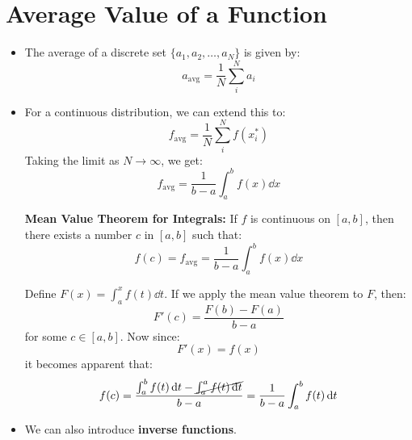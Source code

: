 \section{Average Value of a Function}
\begin{itemize}
    \item The average of a discrete set $\{a_1,a_2,\dots,a_N\}$ is given by:
    \begin{equation}
        a_\text{avg} = \frac{1}{N}\sum_{i}^{N} a_i
        \label{eq:}
    \end{equation}
    \item For a continuous distribution, we can extend this to:
    \begin{equation}
        f_\text{avg} = \frac{1}{N}\sum_{i}^N f(x_i^*)
        \label{eq:}
    \end{equation}
    Taking the limit as $N\to\infty$, we get:
    \begin{equation}
        f_\text{avg} = \frac{1}{b-a} \int_a^b f(x) \dd{x}
        \label{eq:}
    \end{equation}
    \begin{theorem}
        \textbf{Mean Value Theorem for Integrals:} If $f$ is continuous on $[a,b]$, then there exists a number $c$ in $[a,b]$ such that:
        \begin{equation}
            f(c) = f_\text{avg} = \frac{1}{b-a} \int_a^b f(x) \dd{x}
            \label{eq:}
        \end{equation}      
    \end{theorem}
    \begin{prooof}
        Define $F(x)=\int_a^x f(t) \dd{t}$. If we apply the mean value theorem to $F$, then:
        \begin{equation}
            F'(c) = \frac{F(b)-F(a)}{b-a}
            \label{eq:}
        \end{equation}
        for some $c \in [a,b]$. Now since:
        \begin{equation}
            F'(x) = f(x)
            \label{eq:}
        \end{equation}
        it becomes apparent that:
        \begin{equation}
            f(c) = \frac{\int_a^b f(t) \dd{t} - \cancel{\int_a^a f(t) \dd{t}}}{b-a} = \frac{1}{b-a}\int_a^b f(t) \dd{t}
            \label{eq:}
        \end{equation}
    \end{prooof}
    \item We can also introduce \textbf{inverse functions}.

\end{itemize}
